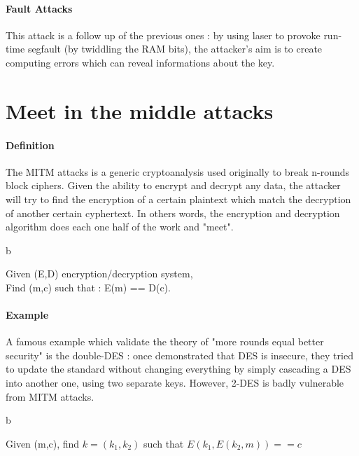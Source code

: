 \paragraph{Fault Attacks \\}
This attack is a follow up of the previous ones : by using laser to provoke run-time segfault (by twiddling the RAM bits), the attacker's aim is to create computing errors which can reveal informations about the key.

\section{Meet in the middle attacks}

\paragraph{Definition\\}
The MITM attacks is a generic cryptoanalysis used originally to break n-rounds block ciphers. Given the ability to encrypt and decrypt any data, the attacker will try to find the encryption of a certain plaintext which match the decryption of another certain cyphertext. In others words, the encryption and decryption algorithm does each one half of the work and "meet".

\begin{mydef}
b \newline
\begin{minipage}[t]{0.8\textwidth}
	Given (E,D) encryption/decryption system, \\
    Find (m,c) such that : E(m) == D(c).
\end{minipage}
\end{mydef}

\paragraph{Example}

A famous example which validate the theory of "more rounds equal better security" is the double-DES : once demonstrated that DES is insecure, they tried to update the standard without changing everything by simply cascading a DES into another one, using two separate keys. However, 2-DES is badly vulnerable from MITM attacks.

\begin{mydef}[Challenge :]
b \newline
\begin{minipage}[t]{0.9\textwidth}
	Given (m,c), find $k = (k_1,k_2)$ such that $E(k_1,E(k_2,m)) == c$
\end{minipage}
\end{mydef}

